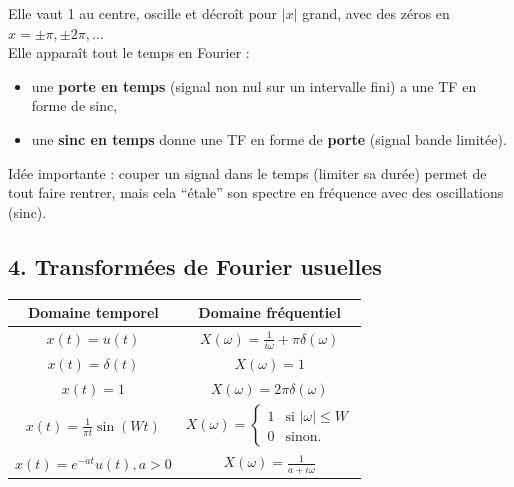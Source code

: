 Elle vaut 1 au centre, oscille et décroît pour $|x|$ grand, avec des zéros en $x = \pm \pi, \pm 2\pi, \dots$ \\

Elle apparaît tout le temps en Fourier :
\begin{itemize}
    \item une \textbf{porte en temps} (signal non nul sur un intervalle fini) a une TF en forme de sinc,
    \item une \textbf{sinc en temps} donne une TF en forme de \textbf{porte} (signal bande limitée). \\
\end{itemize}

Idée importante : couper un signal dans le temps (limiter sa durée) permet de tout faire rentrer,
mais cela “étale” son spectre en fréquence avec des oscillations (sinc).

\newpage
\subsection*{4. Transformées de Fourier usuelles}

\begin{table}[h!]
    \centering
    \begin{tabular}{c|c}
        \toprule
         Domaine temporel & Domaine fréquentiel \\
         \midrule
         $x(t) = u(t)$ & $X(\omega) = \displaystyle\frac{1}{i\omega}+\pi\delta(\omega)$\\

         $x(t) =\delta(t)$ & $X(\omega) = 1$\\

         $x(t) = 1$&$X(\omega) = 2\pi\delta(\omega)$\\

         $x(t) = \displaystyle\frac{1}{\pi t}\sin(Wt)$ & $X(\omega) = \left\{
         \begin{array}{ll}
             1 &  \text{si }|\omega| \leq W \\
             0 &  \text{sinon.}
         \end{array}
         \right.$\\

         $x(t) = e^{-at}u(t), a>0$ & $X(\omega)=\displaystyle\frac{1}{a + i\omega}$\\
	    \bottomrule
    \end{tabular}
    \label{tab:my_label}
\end{table}



